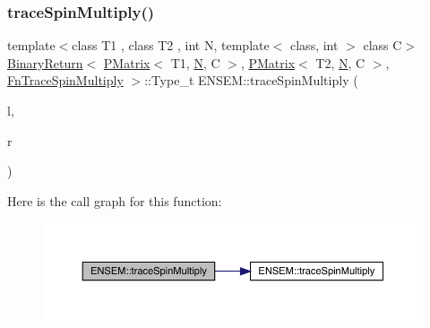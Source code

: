 \subsubsection{\texorpdfstring{traceSpinMultiply()}{traceSpinMultiply()}\hspace{0.1cm}{\footnotesize\ttfamily [1/3]}}
{\footnotesize\ttfamily template$<$class T1 , class T2 , int N, template$<$ class, int $>$ class C$>$ \\
\mbox{\hyperlink{structENSEM_1_1BinaryReturn}{Binary\+Return}}$<$ \mbox{\hyperlink{classENSEM_1_1PMatrix}{P\+Matrix}}$<$ T1, \mbox{\hyperlink{operator__name__util_8cc_a7722c8ecbb62d99aee7ce68b1752f337}{N}}, C $>$, \mbox{\hyperlink{classENSEM_1_1PMatrix}{P\+Matrix}}$<$ T2, \mbox{\hyperlink{operator__name__util_8cc_a7722c8ecbb62d99aee7ce68b1752f337}{N}}, C $>$, \mbox{\hyperlink{structENSEM_1_1FnTraceSpinMultiply}{Fn\+Trace\+Spin\+Multiply}} $>$\+::Type\+\_\+t E\+N\+S\+E\+M\+::trace\+Spin\+Multiply (\begin{DoxyParamCaption}\item[{const \mbox{\hyperlink{classENSEM_1_1PMatrix}{P\+Matrix}}$<$ T1, \mbox{\hyperlink{operator__name__util_8cc_a7722c8ecbb62d99aee7ce68b1752f337}{N}}, C $>$ \&}]{l,  }\item[{const \mbox{\hyperlink{classENSEM_1_1PMatrix}{P\+Matrix}}$<$ T2, \mbox{\hyperlink{operator__name__util_8cc_a7722c8ecbb62d99aee7ce68b1752f337}{N}}, C $>$ \&}]{r }\end{DoxyParamCaption})\hspace{0.3cm}{\ttfamily [inline]}}

Here is the call graph for this function\+:\nopagebreak
\begin{figure}[H]
\begin{center}
\leavevmode
\includegraphics[width=350pt]{df/d0a/group__primmatrix_gabc920df179ac4bd2438224848ec237af_cgraph}
\end{center}
\end{figure}
\mbox{\label{group__primmatrix_gab5fbf23688b38c3209c80d2a9a22b3d0}} 
